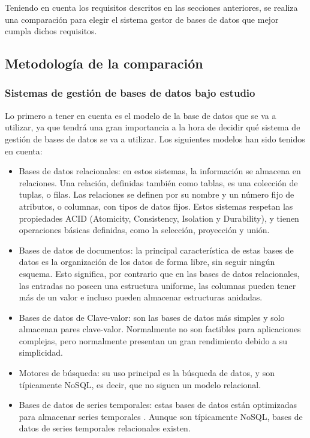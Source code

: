Teniendo en cuenta los requisitos descritos en las secciones anteriores, se realiza una comparación para elegir el sistema 
gestor de bases de datos que mejor cumpla dichos requisitos.

\subsection{Metodología de la comparación}

\subsubsection{Sistemas de gestión de bases de datos bajo estudio}

Lo primero a tener en cuenta es el modelo de la base de datos que se va a utilizar, ya que tendrá una gran importancia
a la hora de decidir qué sistema de gestión de bases de datos se va a utilizar. Los siguientes modelos \cite{10.5555/3364297} han sido
tenidos en cuenta:

\begin{itemize}
    \item Bases de datos relacionales: en estos sistemas, la información se almacena en relaciones. Una relación,
        definidas también como tablas, es una colección de tuplas, o filas. Las relaciones se definen por su nombre
        y un número fijo de atributos, o columnas, con tipos de datos fijos. Estos sistemas respetan las propiedades
        ACID (Atomicity, Consistency, Isolation y Durability), y tienen operaciones básicas definidas, como la selección,
        proyección y unión.
    \item Bases de datos de documentos: la principal característica de estas bases de datos es la organización de los datos
        de forma libre, sin seguir ningún esquema. Esto significa, por contrario que en las bases de datos relacionales,
        las entradas no poseen una estructura uniforme, las columnas pueden tener más de un valor e incluso pueden almacenar
        estructuras anidadas.
    \item Bases de datos de Clave-valor: son las bases de datos más simples y solo almacenan pares clave-valor. Normalmente
        no son factibles para aplicaciones complejas, pero normalmente presentan un gran rendimiento debido a su
        simplicidad.
    \item Motores de búsqueda: su uso principal es la búsqueda de datos, y son típicamente NoSQL, es decir, que no siguen
        un modelo relacional.
    \item Bases de datos de series temporales: estas bases de datos están optimizadas para almacenar series temporales \cite{influx:timeseries}.
        Aunque son típicamente NoSQL, bases de datos de series temporales relacionales existen.
\end{itemize}

